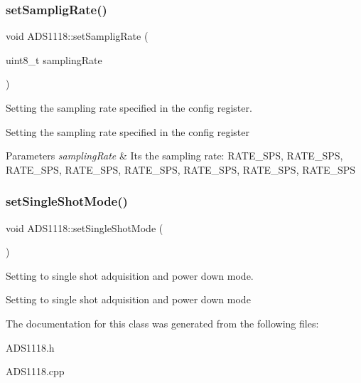 \subsubsection{\texorpdfstring{set\+Samplig\+Rate()}{setSampligRate()}}
{\footnotesize\ttfamily void A\+D\+S1118\+::set\+Samplig\+Rate (\begin{DoxyParamCaption}\item[{uint8\+\_\+t}]{sampling\+Rate }\end{DoxyParamCaption})}



Setting the sampling rate specified in the config register. 

Setting the sampling rate specified in the config register 
\begin{DoxyParams}{Parameters}
{\em sampling\+Rate} & It\textquotesingle{}s the sampling rate\+: R\+A\+T\+E\+\_\+S\+PS, R\+A\+T\+E\+\_\+S\+PS, R\+A\+T\+E\+\_\+S\+PS, R\+A\+T\+E\+\_\+S\+PS, R\+A\+T\+E\+\_\+S\+PS, R\+A\+T\+E\+\_\+S\+PS, R\+A\+T\+E\+\_\+S\+PS, R\+A\+T\+E\+\_\+S\+PS \\
\hline
\end{DoxyParams}
\mbox{\label{class_a_d_s1118_a9e2e456dee0ee957fe89319d12bd833c}} 
\subsubsection{\texorpdfstring{set\+Single\+Shot\+Mode()}{setSingleShotMode()}}
{\footnotesize\ttfamily void A\+D\+S1118\+::set\+Single\+Shot\+Mode (\begin{DoxyParamCaption}{ }\end{DoxyParamCaption})}



Setting to single shot adquisition and power down mode. 

Setting to single shot adquisition and power down mode 

The documentation for this class was generated from the following files\+:\begin{DoxyCompactItemize}
\item 
A\+D\+S1118.\+h\item 
A\+D\+S1118.\+cpp\end{DoxyCompactItemize}
